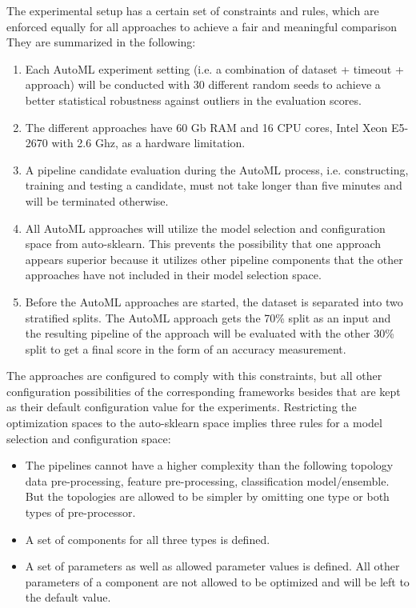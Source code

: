 The experimental setup has a certain set of constraints and rules, which are enforced equally for all approaches to achieve a fair and meaningful comparison
They are summarized in the following:
\begin{enumerate}
    \item Each AutoML experiment setting (i.e. a combination of dataset + timeout + approach) will be conducted with 30 different random seeds to achieve a better statistical robustness against outliers in the evaluation scores.
    \item The different approaches have 60 Gb RAM and 16 CPU cores, Intel Xeon E5-2670 with 2.6 Ghz, as a hardware limitation.
    \item A pipeline candidate evaluation during the AutoML process, i.e. constructing, training and testing a candidate, must not take longer than five minutes and will be terminated otherwise.
    \item All AutoML approaches will utilize the model selection and configuration space from auto-sklearn. This prevents the possibility that one approach appears superior because it utilizes other pipeline components that the other approaches have not included in their model selection space.
    \item Before the AutoML approaches are started, the dataset is separated into two stratified splits. The AutoML approach gets the 70\% split as an input and the resulting pipeline of the approach will be evaluated with the other 30\% split to get a final score in the form of an accuracy measurement.
\end{enumerate}
The approaches are configured to comply with this constraints, but all other configuration possibilities of the corresponding frameworks besides that are kept as their default configuration value for the experiments.\newline
Restricting the optimization spaces to the auto-sklearn space implies three rules for a model selection and configuration space:
\begin{itemize}
    \item The pipelines cannot have a higher complexity than the following topology data pre-processing, feature pre-processing, classification model/ensemble. But the topologies are allowed to be simpler by omitting one type or both types of pre-processor.
    \item A set of components for all three types is defined.
    \item A set of parameters as well as allowed parameter values is defined. All other parameters of a component are not allowed to be optimized and will be left to the default value.
\end{itemize}
